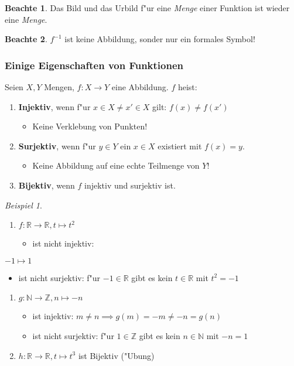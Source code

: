 \documentclass[11pt]{article}
\theoremstyle{remark}
\newtheorem{exa}{Beispiel}[section]
\theoremstyle{definition}
\newtheorem*{notte}{Beachte}
\theoremstyle{remark}
\begin{document}
\begin{notte}
Das Bild und das Urbild f"ur eine \emph{Menge} einer Funktion ist wieder eine \emph{Menge}.
\end{notte}


\begin{notte}
\(f^{-1}\) ist keine Abbildung, sonder nur ein formales Symbol!
\end{notte}

\subsubsection{Einige Eigenschaften von Funktionen}
\label{sec:org1909a84}
Seien \(X,Y\) Mengen, \(f: X\to Y\) eine Abbildung. \(f\) heist:
\begin{relation}
\begin{enumerate}
\item \textbf{Injektiv}, wenn f"ur \(x\in X\not = x' \in X\) gilt: \(f(x) \not = f(x')\)
\begin{itemize}
\item Keine Verklebung von Punkten!
\end{itemize}
\item \textbf{Surjektiv}, wenn f"ur \(y\in Y\) ein \(x\in X\) existiert mit \(f(x)=y\).
\begin{itemize}
\item Keine Abbildung auf eine echte Teilmenge von \(Y\)!
\end{itemize}
\item \textbf{Bijektiv}, wenn \(f\) injektiv und surjektiv ist.
\end{enumerate}
\end{relation}

\begin{exa}\
\begin{enumerate}
\item \(f: \mathbb{R} \to \mathbb{R}, t\mapsto t^2\) 
\begin{itemize}
\item ist nicht injektiv:
\end{itemize}
\end{enumerate}
\(-1\mapsto 1\)
\begin{itemize}
\item ist nicht surjektiv: f"ur \(-1\in \mathbb{R}\) gibt es kein \(t\in\mathbb{R}\)
mit \(t^2=-1\)
\end{itemize}
\begin{enumerate}
\item \(g: \mathbb{N}\to\mathbb{Z}, n\mapsto-n\)
\begin{itemize}
\item ist injektiv: \(m\ne n\implies g(m)=-m \ne -n = g(n)\)
\item ist nicht surjektiv: f"ur \(1\in \mathbb{Z}\) gibt es kein \(n\in \mathbb{N}\)
mit \(-n=1\)
\end{itemize}
\item \(h: \mathbb{R}\to\mathbb{R},t\mapsto t^3\) ist Bijektiv ("Ubung)
\end{enumerate}
\end{exa}
\end{document}
